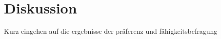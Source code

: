 
\chapter{Diskussion}
\label{ch:diskussion}

Kurz eingehen auf die ergebnisse der präferenz und fähigkeitsbefragung


